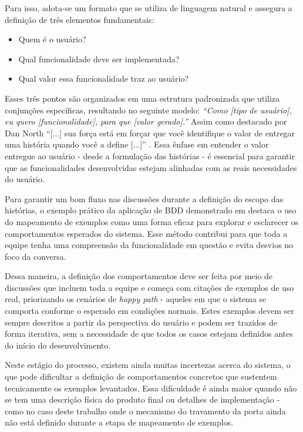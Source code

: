 Para isso, adota-se um formato que se utiliza de linguagem natural e assegura a definição de três elementos fundamentais:

\begin{itemize}
	\item Quem é o usuário?
	\item Qual funcionalidade deve ser implementada?
	\item Qual valor essa funcionalidade traz ao usuário?
\end{itemize}

Esses três pontos são organizados em uma estrutura padronizada que utiliza conjunções específicas, resultando no seguinte modelo:
\textit{“Como [tipo de usuário], eu quero [funcionalidade], para que [valor gerado].”}
Assim como destacado por Dan North ``[...] sua força está em forçar que você identifique o valor de entregar uma história quando você a define [...]'' 
\cite{north2006bdd}. Essa ênfase em entender o valor entregue ao usuário - desde a formulação das histórias - é essencial para garantir que as funcionalidades desenvolvidas estejam 
alinhadas com as reais necessidades do usuário.

Para garantir um bom fluxo nas discussões durante a definição do escopo das histórias, o exemplo prático da aplicação de BDD demonstrado em  
destaca o uso do mapeamento de exemplos como uma forma eficaz para explorar e esclarecer os comportamentos esperados do sistema. Esse método contribui para que 
toda a equipe tenha uma compreensão da funcionalidade em questão e evita desvios no foco da conversa.

Dessa maneira, a definição dos comportamentos deve ser feita por meio de discussões que incluem toda a equipe e começa com citações de exemplos de uso real, priorizando 
os cenários de \textit{happy path} - aqueles em que o sistema se comporta conforme o esperado em condições normais. Estes exemplos devem ser sempre descritos a partir da 
perspectiva do usuário e podem ser trazidos de forma iterativa, sem a necessidade de que todos os casos estejam definidos antes do início do desenvolvimento.

Neste estágio do processo, existem ainda muitas incertezas acerca do sistema, o que pode dificultar a definição de comportamentos concretos que sustentem 
tecnicamente os exemplos levantados. Essa dificuldade é ainda maior quando não se tem uma descrição física do produto final ou detalhes de implementação - como no 
caso deste trabalho onde o mecanismo do travamento da porta ainda não está definido durante a etapa de mapeamento de exemplos.

